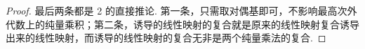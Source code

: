 \begin{proof}
    最后两条都是 2 的直接推论. 第一条，只需取对偶基即可，不影响最高次外代数上的纯量乘积；第二条，诱导的线性映射的复合就是原来的线性映射复合诱导出来的线性映射，而诱导的线性映射的复合无非是两个纯量乘法的复合.
\end{proof}

\begin{summary}

\end{summary}

\begin{exercise}

    \begin{exgroup}
        \item
    \end{exgroup}

    \begin{exgroup}
        \item
    \end{exgroup}

    \begin{exgroup}
        \item
    \end{exgroup}
\end{exercise}
